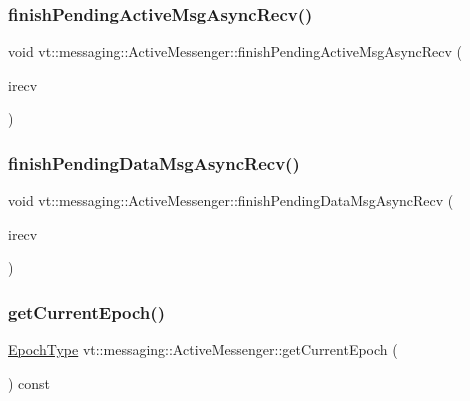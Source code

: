 \subsubsection{\texorpdfstring{finish\+Pending\+Active\+Msg\+Async\+Recv()}{finishPendingActiveMsgAsyncRecv()}}
{\footnotesize\ttfamily void vt\+::messaging\+::\+Active\+Messenger\+::finish\+Pending\+Active\+Msg\+Async\+Recv (\begin{DoxyParamCaption}\item[{\hyperlink{structvt_1_1messaging_1_1_in_progress_i_recv}{In\+Progress\+I\+Recv} $\ast$}]{irecv }\end{DoxyParamCaption})\hspace{0.3cm}{\ttfamily [private]}}

\mbox{\label{structvt_1_1messaging_1_1_active_messenger_a80a13017308870133ff8538741bee394}} 
\subsubsection{\texorpdfstring{finish\+Pending\+Data\+Msg\+Async\+Recv()}{finishPendingDataMsgAsyncRecv()}}
{\footnotesize\ttfamily void vt\+::messaging\+::\+Active\+Messenger\+::finish\+Pending\+Data\+Msg\+Async\+Recv (\begin{DoxyParamCaption}\item[{\hyperlink{structvt_1_1messaging_1_1_in_progress_data_i_recv}{In\+Progress\+Data\+I\+Recv} $\ast$}]{irecv }\end{DoxyParamCaption})\hspace{0.3cm}{\ttfamily [private]}}

\mbox{\label{structvt_1_1messaging_1_1_active_messenger_a5910d45e103a4c0e9c3a69084a58caac}} 
\subsubsection{\texorpdfstring{get\+Current\+Epoch()}{getCurrentEpoch()}}
{\footnotesize\ttfamily \hyperlink{namespacevt_a985a5adf291c34a3ca263b3378388236}{Epoch\+Type} vt\+::messaging\+::\+Active\+Messenger\+::get\+Current\+Epoch (\begin{DoxyParamCaption}{ }\end{DoxyParamCaption}) const}



